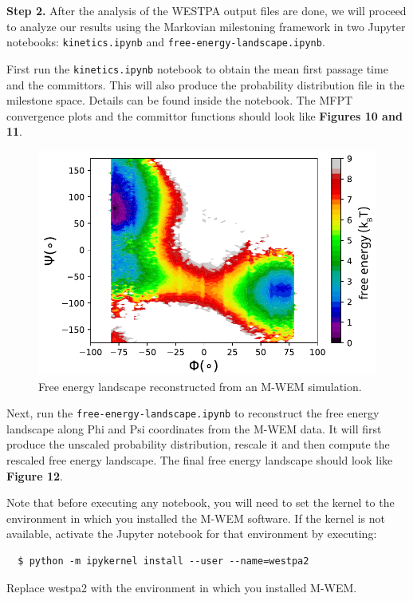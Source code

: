 \textbf{Step 2.} After the analysis of the WESTPA output files are done, we will proceed to analyze our results using the Markovian milestoning framework in two Jupyter notebooks: \verb|kinetics.ipynb| and \verb|free-energy-landscape.ipynb|.\newline

First run the \verb|kinetics.ipynb| notebook to obtain the mean first passage time and the committors. 
This will also produce the probability distribution file in the milestone space. Details can be found inside the notebook. 
The MFPT convergence plots and the committor functions should look like \textbf{Figures 10 and 11}.

\begin{figure}[t]
\centering
\includegraphics[width=\columnwidth]{figures/Figure12_RFree.pdf}
\caption{Free energy landscape reconstructed from an M-WEM simulation.}
\end{figure}

Next, run the \verb|free-energy-landscape.ipynb| to reconstruct the free energy landscape along Phi and Psi coordinates from the M-WEM data. 
It will first produce the unscaled probability distribution, rescale it and then compute the rescaled free energy landscape. 
The final free energy landscape should look like \textbf{Figure 12}.

Note that before executing any notebook, you will need to set the kernel to the environment in which you installed the M-WEM software. 
If the kernel is not available, activate the Jupyter notebook for that environment by executing:

\begin{verbatim}
  $ python -m ipykernel install --user --name=westpa2
\end{verbatim}
Replace westpa2 with the environment in which you installed M-WEM.

